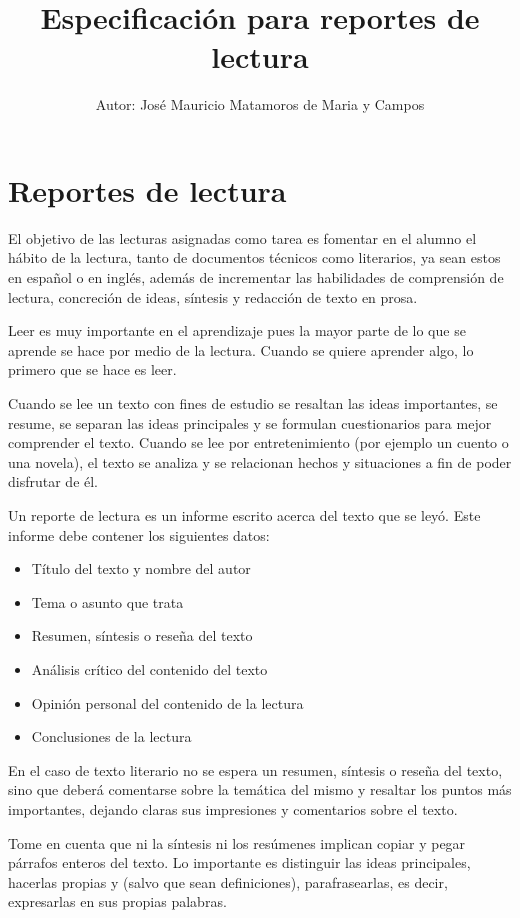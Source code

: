 \documentclass[letterpaper,12pt,twocolumn]{article}
\author{\footnotesize Autor: José Mauricio Matamoros de Maria y Campos}
\title{Especificación para reportes de lectura}
\date{}
\begin{document}
\maketitle

\section*{Reportes de lectura}
El objetivo de las lecturas asignadas como tarea es fomentar en el alumno el hábito de la lectura, tanto de documentos técnicos como literarios, ya sean estos en español o en inglés, además de incrementar las habilidades de comprensión de lectura, concreción de ideas, síntesis y redacción de texto en prosa.

Leer es muy importante en el aprendizaje pues la mayor parte de lo que se aprende se hace por medio de la lectura.
Cuando se quiere aprender algo, lo primero que se hace es leer.

Cuando se lee un texto con fines de estudio se resaltan las ideas importantes, se resume, se separan las ideas principales y se formulan cuestionarios para mejor comprender el texto. Cuando se lee por entretenimiento (por ejemplo un cuento o una novela), el texto se analiza y se relacionan hechos y situaciones a fin de poder disfrutar de él.

Un reporte de lectura es un informe escrito acerca del texto que se leyó.
Este informe debe contener los siguientes datos:

\begin{itemize}[noitemsep]
	\item Título del texto y nombre del autor
	\item Tema o asunto que trata
	\item Resumen, síntesis o reseña del texto
	\item Análisis crítico del contenido del texto
	\item Opinión personal del contenido de la lectura
	\item Conclusiones de la lectura
\end{itemize}

En el caso de texto literario no se espera un resumen, síntesis o reseña del texto, sino que deberá comentarse sobre la temática del mismo y resaltar los puntos más importantes, dejando claras sus impresiones y comentarios sobre el texto.

Tome en cuenta que ni la síntesis ni los resúmenes implican copiar y pegar párrafos enteros del texto. Lo importante es distinguir las ideas principales, hacerlas propias y (salvo que sean definiciones), parafrasearlas, es decir,  expresarlas en sus propias palabras.
\end{document}
